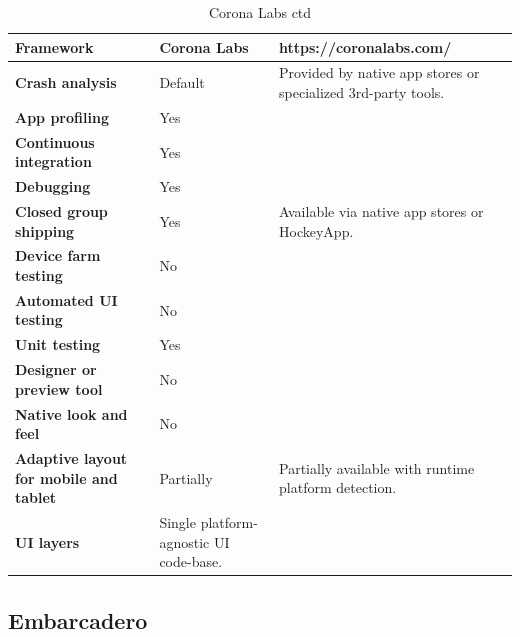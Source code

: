 \documentclass[english,master,public,dept460,male,cpdeclaration,oneside]{diploma}
\begin{document}
\begin{table}[!h]
	\centering
	\caption{Corona Labs ctd}
	\begin{tabular}{p{} | p{} | p{}}
		\toprule		
		\textbf{Framework} & \textbf{Corona Labs} & https://coronalabs.com/ \\
		\midrule
		\textbf{Crash analysis} & Default & Provided by native app stores or specialized 3rd-party tools. \\			
		\midrule
		\textbf{App profiling} & Yes & \\			
		\midrule
		\textbf{Continuous integration} & Yes & \\			
		\midrule
		\textbf{Debugging} & Yes & \\			
		\midrule
		\textbf{Closed group shipping} & Yes & Available via native app stores or HockeyApp. \\			
		\midrule
		\textbf{Device farm testing} & No &  \\			
		\midrule
		\textbf{Automated UI testing} & No & \\			
		\midrule
		\textbf{Unit testing} & Yes & \\			
		\midrule
		\textbf{Designer or preview tool} & No & \\			
		\midrule
		\textbf{Native look and feel} & No & \\			
		\midrule
		\textbf{Adaptive layout for mobile and tablet} & Partially & Partially available with runtime platform detection. \\			
		\midrule		
		\textbf{UI layers} & Single platform-agnostic UI code-base. &  \\			
		\midrule
	\end{tabular}
\end{table}

\clearpage
\subsection{Embarcadero}
\end{document}
